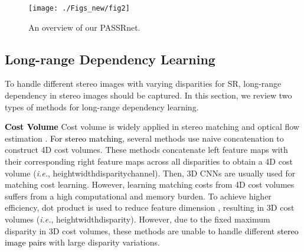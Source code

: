 \documentclass[10pt,twocolumn,letterpaper]{article}
\begin{document}
\begin{figure*}[ht]
	\centering
	\texttt{[image: ./Figs\_new/fig2]}
	\caption{An overview of our PASSRnet.}
	\label{fig2}
\end{figure*}

\subsection{Long-range Dependency Learning}
To handle different stereo images with varying disparities for SR, long-range dependency in stereo images should be captured. In this section, we review two types of methods for long-range dependency learning.








\noindent
\textbf{\textcolor{black}{Cost Volume}}
Cost volume is widely applied in stereo matching \cite{2017-EndtoEndLearningofGeometryandContextforDeepStereoRegression-Kendall-66-75,2018-PyramidStereoMatchingNetwork-Chang--,2018-LearningDeepCorrespondencethroughPriorandPosteriorFeatureConstancy-Liang--} and optical flow estimation \cite{2017-PWCNet:CNNsforOpticalFlowUsingPyramidWarpingandCostVolume-Sun--,2017-AccurateOpticalFlowViaDirectCostVolumeProcessing-Xu-5807-5815}. \textcolor{black}{For stereo matching}, several methods \cite{2017-EndtoEndLearningofGeometryandContextforDeepStereoRegression-Kendall-66-75,2018-PyramidStereoMatchingNetwork-Chang--} use naive concatenation to construct 4D cost volumes. These methods concatenate left feature maps with their corresponding right feature maps across all disparities to obtain a 4D cost volume (\emph{i.e.}, height{width}{disparity}{channel}). Then, 3D CNNs are usually used for matching cost learning. However, learning matching costs from 4D cost volumes suffers from a high computational and memory burden. To achieve higher efficiency, dot product is used to reduce feature dimension \cite{2018-LearningDeepCorrespondencethroughPriorandPosteriorFeatureConstancy-Liang--,2018-LeftRightComparativeRecurrentModelforStereoMatching-Jie--}, resulting in 3D cost volumes (\emph{i.e.}, height{width}{disparity}). However, due to the fixed maximum disparity in 3D cost volumes, these methods are unable to handle different \textcolor{black}{stereo image pairs} with large disparity variations.
\end{document}
